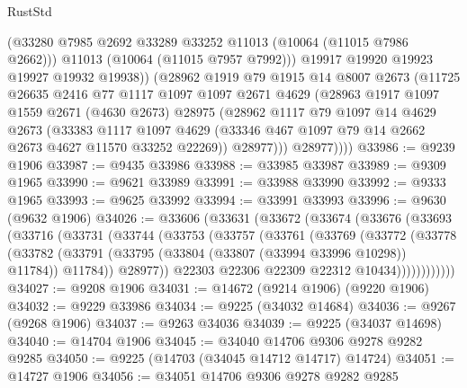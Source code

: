 \begin{lexlean}{RustStd}
\begin{coremodule}
                (@33280 @7985 @2692 @33289 @33252 @11013 (@10064 (@11015 @7986 @2662)))
                @11013
                (@10064 (@11015 @7957 @7992)))
              @19917
              @19920
              @19923
              @19927
              @19932
              @19938))
          (@28962
            @1919
            @79
            @1915
            @14
            @8007
            @2673
            (@11725
              @26635
              @2416
              @77
              @1117
              @1097
              @1097
              @2671
              @4629
              (@28963
                @1917
                @1097
                @1559
                @2671
                (@4630 @2673)
                @28975
                (@28962
                  @1117
                  @79
                  @1097
                  @14
                  @4629
                  @2673
                  (@33383
                    @1117
                    @1097
                    @4629
                    (@33346 @467 @1097 @79 @14 @2662 @2673 @4627 @11570 @33252 @22269))
                  @28977)))
            @28977))))
@33986 := @9239 @1906
@33987 := @9435 @33986
@33988 := @33985 @33987
@33989 := @9309 @1965
@33990 := @9621 @33989
@33991 := @33988 @33990
@33992 := @9333 @1965
@33993 := @9625 @33992
@33994 := @33991 @33993
@33996 := @9630 (@9632 @1906)
@34026 := @33606
    (@33631
      (@33672
        (@33674
          (@33676
            (@33693
              (@33716
                (@33731
                  (@33744
                    (@33753
                      (@33757
                        (@33761
                          (@33769
                            (@33772
                              (@33778
                                (@33782
                                  (@33791
                                    (@33795 (@33804 (@33807 (@33994 @33996 @10298)) @11784))
                                    @11784))
                                @28977))
                            @22303
                            @22306
                            @22309
                            @22312
                            @10434))))))))))))
@34027 := @9208 @1906
@34031 := @14672 (@9214 @1906) (@9220 @1906)
@34032 := @9229 @33986
@34034 := @9225 (@34032 @14684)
@34036 := @9267 (@9268 @1906)
@34037 := @9263 @34036
@34039 := @9225 (@34037 @14698)
@34040 := @14704 @1906
@34045 := @34040 @14706 @9306 @9278 @9282 @9285
@34050 := @9225 (@14703 (@34045 @14712 @14717) @14724)
@34051 := @14727 @1906
@34056 := @34051 @14706 @9306 @9278 @9282 @9285

\end{coremodule}
\end{lexlean}
